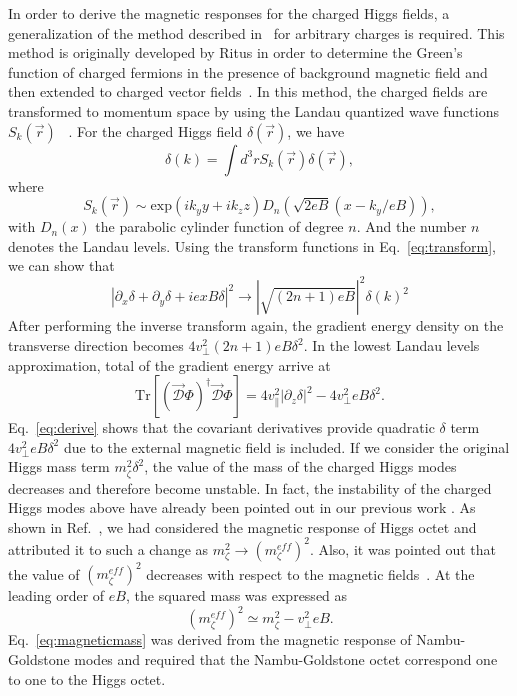 \documentclass[12pt]{article}
\begin{document}
In order to derive the magnetic responses for the charged Higgs fields, 
a generalization of the method described in~\cite{Ritus1985Quantum} for arbitrary
charges is required.
This method is originally developed
by Ritus in order to determine the Green’s function
of charged fermions in the presence of background magnetic field and then  extended to charged vector fields~\cite{Elizalde2004Neutrino}.
In this method, the charged fields are transformed  to momentum space by using the Landau
quantized wave functions $S_k(\vec{r})$ ~\cite{ferrer2007magnetic,Elizalde2004Neutrino}.
For the charged Higgs field $\delta(\vec{r})$, we have
\begin{equation}
\label{eq:transform}
\delta(k) = \int d^3r S_k(\vec{r})\delta(\vec{r}),
\end{equation}
where
\begin{equation}
  S_k(\vec{r}) \sim \text{exp}(ik_y y + ik_z z)D_n(\sqrt{2eB}(x - k_y/eB)),
\end{equation}
with $D_n(x)$ the parabolic cylinder function of degree $n$. And the number $n$ denotes the Landau levels.
Using the transform functions in Eq.~\eqref{eq:transform}, we can show that
\begin{equation}
  |\partial_x \delta + \partial_y \delta + ie xB\delta|^2 \rightarrow
   |   \sqrt{(2n+1) eB} |^2 \delta(k)^2
\end{equation}
After performing the inverse transform again,
 the gradient energy density on the transverse direction becomes $4 v_\perp^2(2n+1) eB\delta^2$.
In the lowest Landau levels approximation, total of the gradient energy arrive at 
 \begin{equation}
\label{eq:derive}
\text{Tr}\left[(\vec{\mathcal{D}}\Phi)^\dagger\vec{\mathcal{D}}\Phi \right] = 
4 v_\parallel^2|\partial_z \delta|^2
- 4 v_\perp^2 eB\delta^2.
\end{equation}
Eq.~\eqref{eq:derive} shows that the covariant derivatives provide  quadratic $\delta$  term $4 v_\perp^2 eB \delta^2$
due to the external magnetic field is included.
If we consider the original Higgs mass term $m_\zeta^2 \delta^2$,
the value of the mass of the charged Higgs modes decreases and therefore become unstable.
In fact, the instability  of the charged Higgs modes above have already been pointed out in our previous work  \cite{zhang2015magnetic}.
As shown in Ref.~\cite{zhang2015magnetic}, we had considered the magnetic response of Higgs octet  and attributed it to such a change as $m_\zeta^2 \rightarrow (m_\zeta^{eff})^2$.
 Also, it was pointed out that the value of $(m_\zeta^{eff})^2$ decreases with respect to the magnetic fields~\cite{zhang2015magnetic}.
At the leading order of $eB$, the squared mass was expressed as
\begin{equation}
\label{eq:magneticmass}
(m_\zeta^{eff})^2 \simeq m_\zeta^2 - v_\perp^2eB.
\end{equation}
Eq.~\eqref{eq:magneticmass} was derived from the magnetic response of Nambu-Goldstone modes and required  that the Nambu-Goldstone
octet correspond one to one to the Higgs octet.
\end{document}

